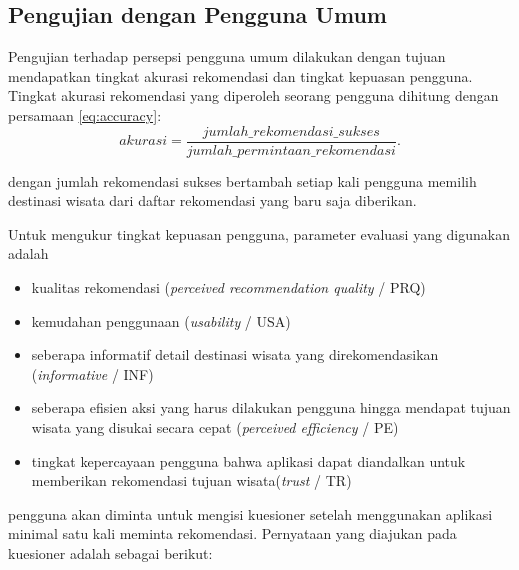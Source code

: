 \subsection{Pengujian dengan Pengguna Umum}
Pengujian terhadap persepsi pengguna umum dilakukan dengan tujuan mendapatkan tingkat akurasi rekomendasi dan tingkat kepuasan pengguna.
Tingkat akurasi rekomendasi yang diperoleh seorang pengguna dihitung dengan persamaan \ref{eq:accuracy}\cite{baizalevaluating}:
\begin{equation}
akurasi = \frac{jumlah\_rekomendasi\_sukses}{jumlah\_permintaan\_rekomendasi}.
\label{eq:accuracy} 
\end{equation}
\par
dengan jumlah rekomendasi sukses bertambah setiap kali pengguna memilih destinasi wisata dari daftar rekomendasi yang baru saja diberikan.
\newline
\par
Untuk mengukur tingkat kepuasan pengguna, parameter evaluasi yang digunakan adalah 
\begin{itemize}
	\item kualitas rekomendasi (\textit{perceived recommendation quality} / PRQ)
	\item kemudahan penggunaan (\textit{usability} / USA) 
	\item seberapa informatif detail destinasi wisata yang direkomendasikan (\textit{informative} / INF)
	\item seberapa efisien aksi yang harus dilakukan pengguna hingga mendapat tujuan wisata yang disukai secara cepat (\textit{perceived efficiency} / PE) 
	\item tingkat kepercayaan pengguna bahwa aplikasi dapat diandalkan untuk memberikan rekomendasi tujuan wisata(\textit{trust} / TR)
\end{itemize}
pengguna akan diminta untuk mengisi kuesioner setelah menggunakan aplikasi minimal satu kali meminta rekomendasi. Pernyataan yang diajukan pada kuesioner adalah sebagai
berikut:

